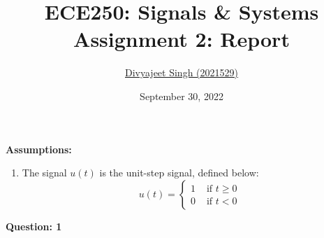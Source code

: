 \documentclass{article}
\title{
    \textbf{ECE250: Signals \& Systems} \\
    \large{Assignment 2: Report}
}
\author{\href{mailto:divyajeet21529@iiitd.ac.in}{Divyajeet Singh (2021529)}}
\date{September 30, 2022}
\begin{document}
    \maketitle

    \textbf{Assumptions:}

    \begin{enumerate}
        \item The signal $u(t)$ is the unit-step signal, defined below: \begin{equation}
            u(t) = \begin{cases}
                1 & \text{ if } t \geq 0 \\
                0 & \text{ if } t < 0
            \end{cases}
        \end{equation}
    \end{enumerate}

    \textbf{Question: 1}
\end{document}
